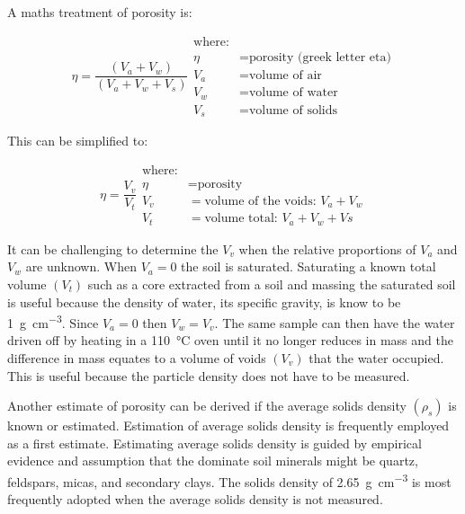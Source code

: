 \documentclass{article}
\begin{document}
A maths treatment of porosity is:

\begin{equation}
    \eta = \frac{\left(V_a + V_w\right)}{\left(V_a + V_w + V_s\right)}
    \begin{aligned}
        \text{where:}\\
        \eta &= \text{porosity (greek letter eta)}\\
        V_a &= \text{volume of air}\\
        V_w &= \text{volume of water}\\
        V_s &= \text{volume of solids}
    \end{aligned}
\end{equation}

This can be simplified to:

\begin{equation}
    \eta = \frac{V_v}{V_t}
    \begin{aligned}
        \text{where:}\\
        \eta &= \text{porosity}\\
        V_v &= \text{volume of the voids}:\,V_a+V_w\\
        V_t &= \text{volume total}:\,V_a+V_w+Vs
    \end{aligned}
\end{equation}

It can be challenging to determine the $V_v$ when the relative proportions of $V_a$ and $V_w$ are unknown. When $V_a = 0$ the soil is saturated. Saturating a known total volume $\left(V_t\right)$  such as a core extracted from a soil and massing the saturated soil is useful because the density of water, its specific gravity, is know to be \qty[per-mode = symbol]{1}{\gram\per\cubic\centi\metre}. Since $V_a=0$ then $V_w=V_v$. The same sample can then have the water driven off by heating in a \qty{110}{\degreeCelsius} oven until it no longer reduces in mass and the difference in mass equates to a volume of voids $\left(V_v\right)$ that the water occupied. This is useful because the particle density does not have to be measured.

Another estimate of porosity can be derived if the average solids density $\left(\rho_s\right)$ is known or estimated. Estimation of average solids density is frequently employed as a first estimate. Estimating average solids density is guided by empirical evidence and assumption that the dominate soil minerals might be quartz, feldspars, micas, and secondary clays. The solids density of \qty[per-mode = symbol]{2.65}{\gram\per\cubic\centi\metre} is most frequently adopted when the average solids density is not measured.
\end{document}
